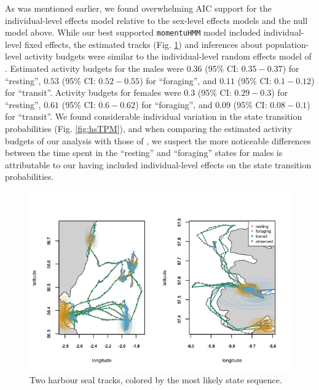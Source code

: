 \documentclass[12pt]{article}\usepackage[]{graphicx}\usepackage[]{color}
\begin{document}
As was mentioned earlier, we found overwhelming AIC support for the individual-level effects model relative to the sex-level effects models and the null model above. While our best supported \verb|momentuHMM| model included individual-level fixed effects, the estimated tracks (Fig. \ref{fig:hsTracks}) and inferences about population-level activity budgets were similar to the individual-level random effects model of \cite{McClintockEtAl2013c}. Estimated activity budgets for the males were $0.36$ (95\% CI: $0.35-0.37$) for ``resting'', $0.53$ (95\% CI: $0.52-0.55$) for ``foraging'', and $0.11$ (95\% CI: $0.1-0.12$) for ``transit''.  Activity budgets for females were $0.3$ (95\% CI: $0.29-0.3$) for ``resting'', $0.61$ (95\% CI: $0.6-0.62$) for ``foraging'', and $0.09$ (95\% CI: $0.08-0.1$) for ``transit''. We found considerable individual variation in the state transition probabilities (Fig. \ref{fig:hsTPM}), and when comparing the estimated activity budgets of our analysis with those of \cite{McClintockEtAl2013c}, we suspect the more noticeable differences between the time spent in the ``resting'' and ``foraging'' states for males is attributable to our having included individual-level effects on the state transition probabilities.  
\begin{figure}[htbp]
  \centering
  \includegraphics[width=\textwidth]{plot_harbourSeal.png}
  \caption{Two harbour seal tracks, colored by the most likely state sequence.}
  \label{fig:hsTracks}
\end{figure}
\end{document}

